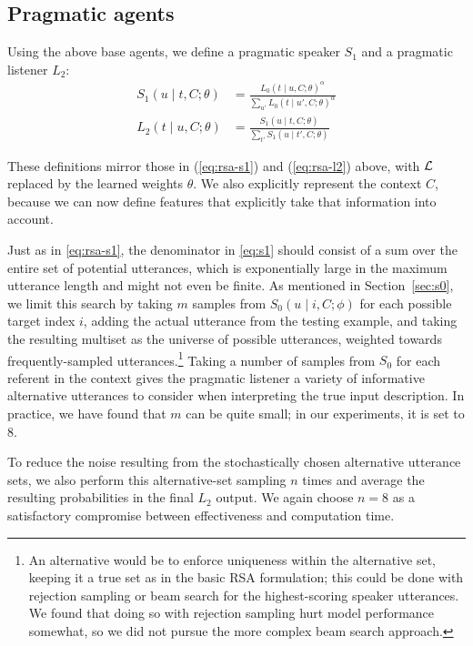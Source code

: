 \documentclass[11pt,letterpaper]{article}
\newcommand{\eq}[1]{(\ref{#1})}
\newcommand{\Listener}{L}
\newcommand{\Speaker}{S}
\newcommand{\utt}{u}
\newcommand{\context}{C}
\newcommand{\target}{t}
\newcommand{\numsamples}{m}
\renewcommand{\|}{\mid}
\newcommand{\secref}[1]{Section~\ref{#1}}
\begin{document}
\subsection{Pragmatic agents}\label{sec:l2}

Using the above base agents, we define a pragmatic speaker
$\Speaker_{1}$ and a pragmatic listener
$\Listener_{2}$:
%
\begin{align}
\Speaker_1(\utt \| \target, \context; \theta)
  &= \frac{\Listener_0(\target \| \utt, \context; \theta)^\alpha}{\sum_{\utt'}
    \Listener_0(\target \| \utt', \context; \theta)^\alpha}
    \label{eq:s1} \\
  \Listener_2(\target \| \utt, \context; \theta)
  &=
    \frac{
    \Speaker_1(\utt \| \target, \context; \theta)
    }{
    \sum_{\target'} \Speaker_1(\utt \| \target', \context; \theta)
    }
\end{align}

These definitions mirror those in \eq{eq:rsa-s1} and \eq{eq:rsa-l2}
above, with $\mathcal{L}$ replaced by the learned weights $\theta$. We also
explicitly represent the context $\context$, because we can now define
features that explicitly take that information into account.

Just as in \eqref{eq:rsa-s1}, the denominator in \eqref{eq:s1} should consist of a sum over
the entire set of potential utterances, which is exponentially large in the
maximum utterance length and might not even be finite.
As mentioned in \secref{sec:s0}, we limit this search by
taking $\numsamples$ samples from $\Speaker_0(\utt \| i, \context; \phi)$ for
each possible target index $i$, adding the actual utterance from the testing example,
and taking the resulting multiset as the universe of possible utterances,
weighted towards frequently-sampled utterances.\footnote{An alternative would
be to enforce uniqueness within the alternative set, keeping it a true set as in the
basic RSA formulation; this could be done with rejection sampling or beam search
for the highest-scoring speaker utterances. We found that doing so with
rejection sampling hurt model performance somewhat, so we did not
pursue the more complex beam search approach.} Taking a number
of samples from $\Speaker_0$ for each referent in the context gives the pragmatic
listener a variety of informative alternative utterances to consider when
interpreting the true input description.
In practice, we have found that $\numsamples$
can be quite small; in our experiments, it is set to $8$.

To reduce the noise
resulting from the stochastically chosen alternative utterance sets, we also perform
this alternative-set sampling $n$ times and average the resulting probabilities in
the final $\Listener_2$ output. We again choose $n = 8$ as a satisfactory
compromise between effectiveness and computation time.
\end{document}
